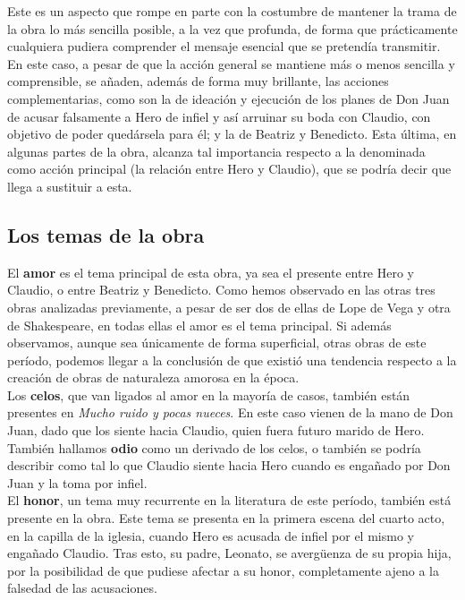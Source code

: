 \documentclass[12pt,a4paper]{article}
\begin{document}
Este es un aspecto que rompe en parte con la costumbre de mantener la trama de la obra lo más sencilla posible, a la vez que profunda, de forma que prácticamente cualquiera pudiera comprender el mensaje esencial que se pretendía transmitir. En este caso, a pesar de que la acción general se mantiene más o menos sencilla y comprensible, se añaden, además de forma muy brillante, las acciones complementarias, como son la de ideación y ejecución de los planes de Don Juan de acusar falsamente a Hero de infiel y así arruinar su boda con Claudio, con objetivo de poder quedársela para él; y la de Beatriz y Benedicto. Esta última, en algunas partes de la obra, alcanza tal importancia respecto a la denominada como acción principal (la relación entre Hero y Claudio), que se podría decir que llega a sustituir a esta.

\subsection{Los temas de la obra}

El \textbf{amor} es el tema principal de esta obra, ya sea el presente entre Hero y Claudio, o entre Beatriz y Benedicto. Como hemos observado en las otras tres obras analizadas previamente, a pesar de ser dos de ellas de Lope de Vega y otra de Shakespeare, en todas ellas el amor es el tema principal. Si además observamos, aunque sea únicamente de forma superficial, otras obras de este período, podemos llegar a la conclusión de que existió una tendencia respecto a la creación de obras de naturaleza amorosa en la época.\\

Los \textbf{celos}, que van ligados al amor en la mayoría de casos, también están presentes en \textit{Mucho ruido y pocas nueces}. En este caso vienen de la mano de Don Juan, dado que los siente hacia Claudio, quien fuera futuro marido de Hero.\\

También hallamos \textbf{odio} como un derivado de los celos, o también se podría describir como tal lo que Claudio siente hacia Hero cuando es engañado por Don Juan y la toma por infiel.\\

El \textbf{honor}, un tema muy recurrente en la literatura de este período, también está presente en la obra. Este tema se presenta en la primera escena del cuarto acto, en la capilla de la iglesia, cuando Hero es acusada de infiel por el mismo y engañado Claudio. Tras esto, su padre, Leonato, se avergüenza de su propia hija, por la posibilidad de que pudiese afectar a su honor, completamente ajeno a la falsedad de las acusaciones.\\
\end{document}
